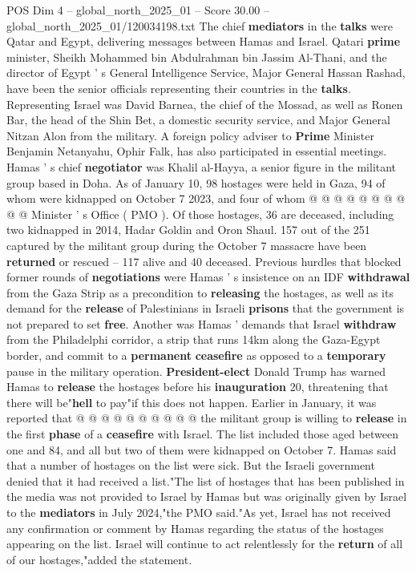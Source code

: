 \begin{textsample}{POS Dim 4 – global\_north\_2025\_01 – Score 30.00 – global\_north\_2025\_01/120034198.txt}
The chief \textbf{mediators} in the \textbf{talks} were Qatar and Egypt, delivering messages between Hamas and Israel.
Qatari \textbf{prime} minister, Sheikh Mohammed bin Abdulrahman bin Jassim Al-Thani, and the director of Egypt ' s General Intelligence Service, Major General Hassan Rashad, have been the senior officials representing their countries in the \textbf{talks}.
Representing Israel was David Barnea, the chief of the Mossad, as well as Ronen Bar, the head of the Shin Bet, a domestic security service, and Major General Nitzan Alon from the military.
A foreign policy adviser to \textbf{Prime} Minister Benjamin Netanyahu, Ophir Falk, has also participated in essential meetings.
Hamas ' s chief \textbf{negotiator} was Khalil al-Hayya, a senior figure in the militant group based in Doha.
As of January 10, 98 hostages were held in Gaza, 94 of whom were kidnapped on October 7 2023, and four of whom @ @ @ @ @ @ @ @ @ @ Minister ' s Office ( PMO ).
Of those hostages, 36 are deceased, including two kidnapped in 2014, Hadar Goldin and Oron Shaul. 157 out of the 251 captured by the militant group during the October 7 massacre have been \textbf{returned} or rescued -- 117 alive and 40 deceased.
Previous hurdles that blocked former rounds of \textbf{negotiations} were Hamas ' s insistence on an IDF \textbf{withdrawal} from the Gaza Strip as a precondition to \textbf{releasing} the hostages, as well as its demand for the \textbf{release} of Palestinians in Israeli \textbf{prisons} that the government is not prepared to set \textbf{free}.
Another was Hamas ' demands that Israel \textbf{withdraw} from the Philadelphi corridor, a strip that runs 14km along the Gaza-Egypt border, and commit to a \textbf{permanent} \textbf{ceasefire} as opposed to a \textbf{temporary} pause in the military operation. \textbf{President-elect} Donald Trump has warned Hamas to \textbf{release} the hostages before his \textbf{inauguration} 20, threatening that there will be"\textbf{hell} to pay"if this does not happen.
Earlier in January, it was reported that @ @ @ @ @ @ @ @ @ @ the militant group is willing to \textbf{release} in the first \textbf{phase} of a \textbf{ceasefire} with Israel.
The list included those aged between one and 84, and all but two of them were kidnapped on October 7.
Hamas said that a number of hostages on the list were sick.
But the Israeli government denied that it had received a list."The list of hostages that has been published in the media was not provided to Israel by Hamas but was originally given by Israel to the \textbf{mediators} in July 2024,"the PMO said."As yet, Israel has not received any confirmation or comment by Hamas regarding the status of the hostages appearing on the list.
Israel will continue to act relentlessly for the \textbf{return} of all of our hostages,"added the statement.

\end{textsample}

